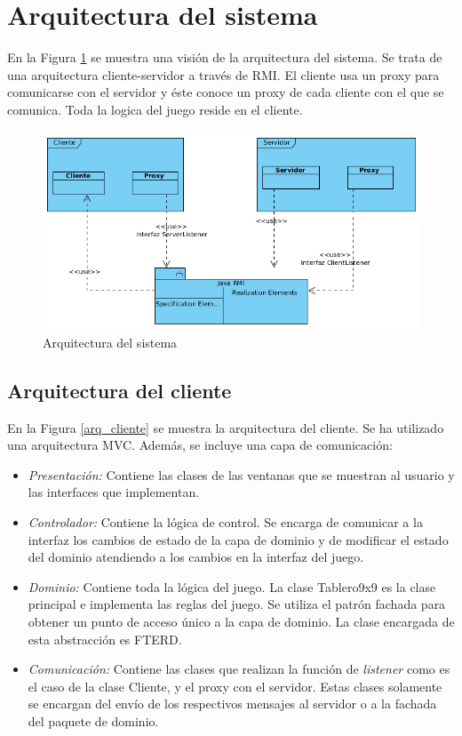 \section{Arquitectura del sistema} 

En la Figura \ref{arq_sistema} se muestra una visión de la arquitectura del sistema. Se
trata de una arquitectura cliente-servidor a través de RMI. El cliente usa
un proxy para comunicarse con el servidor y éste conoce un proxy de cada
cliente con el que se comunica. Toda la logica del juego reside en el cliente.

 \begin{figure}[h]
 \centering
 \includegraphics[scale=0.65]{img/arquitectura/arquitectura.png}
 \caption{Arquitectura del sistema}
 \label{arq_sistema}
 \end{figure}

\subsection{Arquitectura del cliente}
 
En la Figura \ref{arq_cliente} se muestra la arquitectura del cliente. Se ha utilizado una arquitectura MVC.
Además, se incluye una capa de comunicación:

\begin{itemize}
 \item \emph{Presentación:} Contiene las clases de las ventanas que se muestran al usuario y las interfaces que implementan.
 \item \emph{Controlador:} Contiene la lógica de control. Se encarga de comunicar a la interfaz los cambios de estado de la
 capa de dominio y de modificar el estado del dominio atendiendo a los cambios en la interfaz del juego.
 \item \emph{Dominio:} Contiene toda la lógica del juego. La clase Tablero9x9 es la clase principal e implementa las reglas del 
 juego. Se utiliza el patrón fachada para obtener un punto de acceso único a la capa de dominio. La clase encargada de 
 esta abstracción es FTERD.
 \item \emph{Comunicación:} Contiene las clases que realizan la función de \emph{listener} como es el caso de la clase Cliente,
 y el proxy con el servidor. Estas clases solamente se encargan del envío de los respectivos mensajes al servidor o a la fachada
 del paquete de dominio.
\end{itemize}

